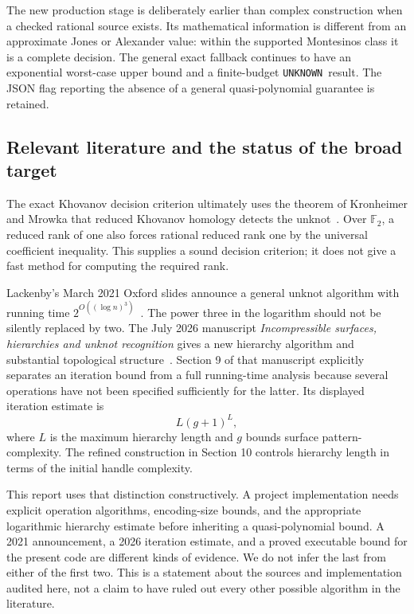 \documentclass[11pt,a4paper]{article}
\theoremstyle{definition}
\theoremstyle{remark}
\newcommand{\F}{\mathbb F}
\newcommand{\unknown}{\texttt{UNKNOWN}}
\numberwithin{equation}{section}
\begin{document}
The new production stage is deliberately earlier than complex construction
when a checked rational source exists. Its mathematical information is
different from an approximate Jones or Alexander value: within the supported
Montesinos class it is a complete decision. The general exact fallback
continues to have an exponential worst-case upper bound and a finite-budget
\unknown\ result. The JSON flag reporting the absence of a general
quasi-polynomial guarantee is retained.

\subsection{Relevant literature and the status of the broad target}
\label{subsec:literature-status}

The exact Khovanov decision criterion ultimately uses the theorem of
Kronheimer and Mrowka that reduced Khovanov homology detects the
unknot~\cite{kronheimer-mrowka}. Over \(\F_2\), a reduced rank of one also
forces rational reduced rank one by the universal coefficient inequality.
This supplies a sound decision criterion; it does not give a fast method
for computing the required rank.

Lackenby's March 2021 Oxford slides announce a general unknot algorithm
with running time \(2^{O((\log n)^3)}\)~\cite{lackenby-2021}.
The power three in the logarithm should not be silently replaced by two.
The July 2026 manuscript \emph{Incompressible surfaces, hierarchies and
unknot recognition} gives a new hierarchy algorithm and substantial
topological structure~\cite{lackenby-2026}. Section 9 of that manuscript
explicitly separates an iteration bound from a full running-time analysis
because several operations have not been specified sufficiently for the
latter. Its displayed iteration estimate is
\[
 L(g+1)^L,
\]
where \(L\) is the maximum hierarchy length and \(g\) bounds surface
pattern-complexity. The refined construction in Section 10 controls
hierarchy length in terms of the initial handle complexity.

This report uses that distinction constructively. A project implementation
needs explicit operation algorithms, encoding-size bounds, and the
appropriate logarithmic hierarchy estimate before inheriting a
quasi-polynomial bound. A 2021 announcement, a 2026 iteration estimate,
and a proved executable bound for the present code are different kinds
of evidence. We do not infer the last from either of the first two.
This is a statement about the sources and implementation audited here,
not a claim to have ruled out every other possible algorithm in the
literature.
\end{document}

